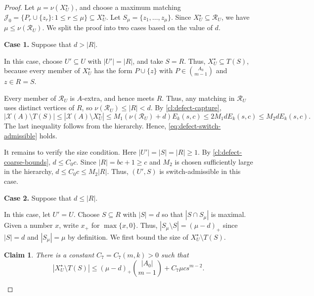 \documentclass[10pt,a4paper]{amsart}
\newtheorem{claim}{Claim}
\newcommand{\Rcal}{\mathcal R}
\newcommand{\X}{\mathcal X}
\begin{document}
\begin{proof}
        Let $\mu=\nu(X_U^\star)$, and choose a maximum matching $\mathcal J_0
                =
                \{P_r\cup\{z_r\}:1\le r\le\mu\}
                \subseteq X_U^\star$.
        Let $S_\mu=\{z_1,\ldots,z_\mu\}$.
        Since $X_U^\star\subseteq\Rcal_U$, we have
        $\mu\le\nu(\Rcal_U)$.
        We split the proof into two cases based on the value of $d$.

        \medskip
        \noindent\textbf{Case 1.} Suppose that $d>|R|$.
        \medskip

        In this case, choose $U'\subseteq U$ with $|U'|=|R|$, and take $S=R$.
        Thus, $X_U^\star\subseteq T(S)$, because every member of
        $X_U^\star$ has the form $P\cup\{z\}$ with
        $P\in\binom{A_0}{m-1}$ and $z\in R=S$.

        Every member of $\Rcal_U$ is $A$-extra, and hence meets $R$.
        Thus, any matching in $\Rcal_U$ uses distinct vertices of $R$,
        so $\nu(\Rcal_U)\le |R|<d$.
        By \cref{cl:defect-capture},
        \[
                |\X(A)\setminus T(S)|
                \le
                |\X(A)\setminus X_U^\star|
                \le
                M_1(\nu(\Rcal_U)+d)E_k(s,c)
                \le
                2M_1dE_k(s,c)\le M_2dE_k(s,c).
        \]
        The last inequality follows from the hierarchy.  Hence,
        \eqref{eq:defect-switch-admissible} holds.

        It remains to verify the size condition.
        Here $|U'|=|S|=|R|\ge1$.
        By \cref{cl:defect-coarse-bounds}, $d\le C_0c$.
        Since $|R|=bc+1\ge c$ and $M_2$ is chosen sufficiently large
        in the hierarchy, $d\le C_0c\le M_2|R|$.
        Thus, $(U',S)$ is switch-admissible in this case.

        \medskip
        \noindent\textbf{Case 2.} Suppose that $d\le |R|$.
        \medskip

        In this case, let $U'=U$.
        Choose $S\subseteq R$ with $|S|=d$ so that $|S\cap S_\mu|$ is
        maximal.
        Given a number $x$, write $x_+$ for $\max\{x,0\}$.
        Thus, $|S_\mu\setminus S|=(\mu-d)_+$ since $|S|=d$ and $|S_\mu|=\mu$ by definition.
        We first bound the size of $X_U^\star\setminus T(S)$.
        \begin{claim}\label{cl:clean-center-XU-loss}
                There is a constant $C_7=C_7(m,k)>0$ such that
                \[
                        |X_U^\star\setminus T(S)|
                        \le
                        (\mu-d)_+\binom{|A_0|}{m-1}
                        +C_7\mu cs^{m-2}.
                \]
        \end{claim}


\end{proof}
\end{document}
